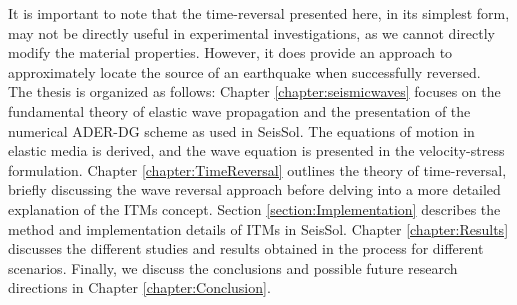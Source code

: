 It is important to note that the time-reversal presented here, in its simplest form, may not be directly useful in experimental 
investigations, as we cannot directly modify the material properties. However, it does provide an approach to approximately 
locate the source of an earthquake when successfully reversed.\\

The thesis is organized as follows: Chapter \ref{chapter:seismicwaves} focuses on the fundamental theory of elastic wave propagation and the presentation
of the numerical \ac{ADER}-\ac{DG} scheme as used in SeisSol. The equations of motion in elastic media is derived, and the wave equation is presented
in the velocity-stress formulation. Chapter \ref{chapter:TimeReversal} outlines the theory of time-reversal, briefly discussing the wave reversal approach before
delving into a more detailed explanation of the \ac{ITM}s concept. Section \ref{section:Implementation} describes the method and implementation details of \ac{ITM}s
in SeisSol. Chapter \ref{chapter:Results} discusses the different studies and results obtained in the process for different scenarios. Finally, we discuss the conclusions
and possible future research directions in Chapter \ref{chapter:Conclusion}. 

